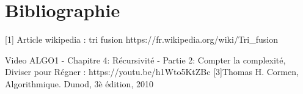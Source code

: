 \chapter{Bibliographie}

 [1] Article wikipedia : tri fusion https://fr.wikipedia.org/wiki/Tri_fusion
 \par
 [2] Video ALGO1 - Chapitre 4: Récursivité - Partie 2: Compter la complexité, Diviser pour Régner : https://youtu.be/h1Wto5KtZBc
 [3]Thomas H. Cormen, Algorithmique. Dunod, 3è édition, 2010
 \par